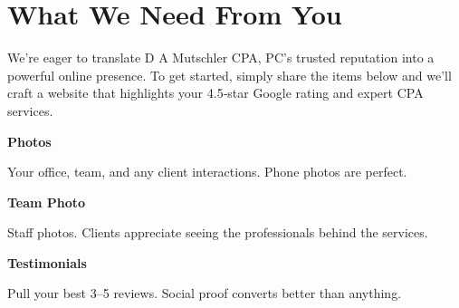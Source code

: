 \documentclass[11pt,letterpaper]{article}
\begin{document}
\vspace{0.2em}

\section*{What We Need From You}

We’re eager to translate D A Mutschler CPA, PC’s trusted reputation into a powerful online presence. To get started, simply share the items below and we’ll craft a website that highlights your 4.5‑star Google rating and expert CPA services.

\vspace{0.12em}

\noindent\begin{minipage}[t]{0.48\textwidth}
\begin{tcolorbox}[colframe=accent-teal, boxrule=1pt, left=0.7em, right=0.7em, top=0.5em, bottom=0.5em, arc=4pt, boxsep=0pt]
{\bfseries\small\color{accent-teal}Photos}

\vspace{0.15em}

{\small Your office, team, and any client interactions. Phone photos are perfect.}
\end{tcolorbox}

\vspace{0.1em}

\begin{tcolorbox}[colframe=accent-teal, boxrule=1pt, left=0.7em, right=0.7em, top=0.5em, bottom=0.5em, arc=4pt, boxsep=0pt]
{\bfseries\small\color{accent-teal}Team Photo}

\vspace{0.15em}

{\small Staff photos. Clients appreciate seeing the professionals behind the services.}
\end{tcolorbox}

\vspace{0.1em}

\begin{tcolorbox}[colframe=accent-teal, boxrule=1pt, left=0.7em, right=0.7em, top=0.5em, bottom=0.5em, arc=4pt, boxsep=0pt]
{\bfseries\small\color{accent-teal}Testimonials}

\vspace{0.15em}

{\small Pull your best 3–5 reviews. Social proof converts better than anything.}
\end{tcolorbox}
\end{minipage}
\hfill
\end{document}
